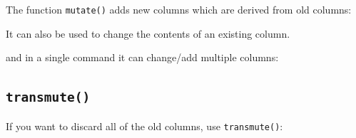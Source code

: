 \documentclass[titlepage]{book}\usepackage{knitr}
\begin{document}
The function \texttt{mutate()} adds new columns which are derived from old columns:
\begin{knitrout}
\color{fgcolor}\begin{kframe}
\begin{alltt}
 \hlkwb{<-}   \hlopt{/}\hlstd{)}
\end{alltt}
\end{kframe}
\end{knitrout}
It can also be used to change the contents of an existing column.

\begin{knitrout}
\color{fgcolor}\begin{kframe}
\begin{alltt}
 \hlkwb{<-}   \hlopt{/}\hlstd{)}
\end{alltt}
\end{kframe}
\end{knitrout}
 and in a single command it can change/add multiple columns:
 
\begin{knitrout}
\color{fgcolor}\begin{kframe}
\begin{alltt}
 \hlkwb{<-}   \hlopt{/}\hlstd{,}
                \hlopt{/}
                \hlopt{-}\hlstd{)}
\hlstd{(} \hlstd{)}
\end{alltt}
\end{kframe}
\end{knitrout}

\subsection{\texttt{transmute()}}

If you want to discard all of the old columns, use \texttt{transmute()}:
\begin{knitrout}
\color{fgcolor}\begin{kframe}
\begin{alltt}
 \hlkwb{<-}  \hlopt{/}\hlstd{,} \hlopt{/}\hlstd{,} 
\end{alltt}
\end{kframe}
\end{knitrout}
\end{document}
